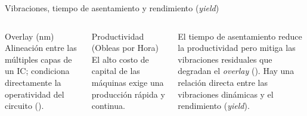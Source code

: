 \documentclass[en,16:9,navbarinline,bigfoot]{sdqbeamer}
\begin{document}
\begin{frame}{Vibraciones, tiempo de asentamiento y rendimiento (\textit{yield})}
    \begin{columns}
        \begin{blueblock}{Overlay (nm)}
            Alineación entre las múltiples capas de un IC; condiciona directamente la operatividad del circuito (\cite{Schmidt2012_UltraPrecision}).
        \end{blueblock}

        \begin{greenblock}{Productividad (Obleas por Hora)}
            El alto costo de capital de las máquinas exige una producción rápida y continua.
        \end{greenblock}

        \vspace{0.2cm}
        El tiempo de asentamiento reduce la productividad pero mitiga las vibraciones residuales que degradan el \textit{overlay} (\cite{Butler2011_PositionControl}). Hay una relación directa entre las vibraciones dinámicas y el rendimiento (\textit{yield}).


\end{columns}
\end{frame}
\end{document}
